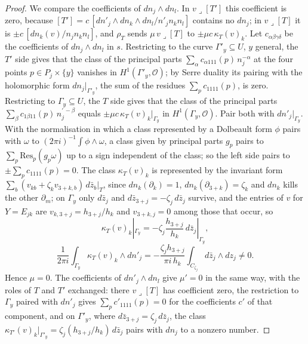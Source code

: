 \documentclass[11pt,reqno]{amsart}
\numberwithin{equation}{section}
\theoremstyle{plain}
\theoremstyle{definition}
\begin{document}
\begin{proof}
We compare the coefficients of $dn_{j}\wedge dn_{l}$. In $v\lrcorner[T']$ this coefficient is zero, because $[T']=c\,[dn'_{j}\wedge dn_{k}\wedge dn_{l}/n'_{j}n_{k}n_{l}]$ contains no $dn_{j}$; in $v\lrcorner[T]$ it is $\pm c\,[dn_{k}(v)/n_{j}n_{k}n_{l}]$, and $\rho_{T}$ sends $\mu\,v\lrcorner[T]$ to $\pm\mu c\,\kappa_{T}(v)_{k}$. Let $c_{\alpha\beta\gamma\delta}$ be the coefficients of $dn_{j}\wedge dn_{l}$ in $s$. Restricting to the curve $\Gamma'_{y}\subseteq U$, $y$ general, the $T'$ side gives that the class of the principal parts $\sum_{\alpha}c_{\alpha111}(p)\,n_{j}^{-\alpha}$ at the four points $p\in P_{j}\times\{y\}$ vanishes in $H^{1}(\Gamma'_{y},\mathcal{O})$; by Serre duality its pairing with the holomorphic form $dn_{j}|_{\Gamma'_{y}}$, the sum of the residues $\sum_{p}c_{1111}(p)$, is zero. Restricting to $\Gamma_{y}\subseteq U$, the $T$ side gives that the class of the principal parts $\sum_{\beta}c_{1\beta11}(p)\,n_{j}^{\prime\,-\beta}$ equals $\pm\mu c\,\kappa_{T}(v)_{k}|_{\Gamma_{y}}$ in $H^{1}(\Gamma_{y},\mathcal{O})$. Pair both with $dn'_{j}|_{\Gamma_{y}}$. With the normalisation in which a class represented by a Dolbeault form $\phi$ pairs with $\omega$ to $(2\pi i)^{-1}\int\phi\wedge\omega$, a class given by principal parts $g_{p}$ pairs to $\sum_{p}\mathrm{Res}_{p}(g_{p}\omega)$ up to a sign independent of the class; so the left side pairs to $\pm\sum_{p}c_{1111}(p)=0$. The class $\kappa_{T}(v)_{k}$ is represented by the invariant form $\sum_{b}(v_{kb}+\zeta_{k}v_{3+k,b})\,d\bar z_{b}|_{T}$, since $dn_{k}(\partial_{k})=1$, $dn_{k}(\partial_{3+k})=\zeta_{k}$ and $dn_{k}$ kills the other $\partial_{m}$; on $\Gamma_{y}$ only $d\bar z_{j}$ and $d\bar z_{3+j}=-\zeta_{j}\,d\bar z_{j}$ survive, and the entries of $v$ for $Y=E_{jk}$ are $v_{k,3+j}=h_{3+j}/h_{k}$ and $v_{3+k,j}=0$ among those that occur, so
\[
\kappa_{T}(v)_{k}|_{\Gamma_{y}}=-\zeta_{j}\frac{h_{3+j}}{h_{k}}\,d\bar z_{j}|_{\Gamma_{y}},
\]
\[
\frac{1}{2\pi i}\int_{\Gamma_{y}}\kappa_{T}(v)_{k}\wedge dn'_{j}=-\frac{\zeta_{j}h_{3+j}}{\pi i\,h_{k}}\int_{C_{\zeta_{j}}}d\bar z_{j}\wedge dz_{j}\ne0 .
\]
Hence $\mu=0$. The coefficients of $dn'_{j}\wedge dn_{l}$ give $\mu'=0$ in the same way, with the roles of $T$ and $T'$ exchanged: there $v\lrcorner[T]$ has coefficient zero, the restriction to $\Gamma_{y}$ paired with $dn'_{j}$ gives $\sum_{p}c'_{1111}(p)=0$ for the coefficients $c'$ of that component, and on $\Gamma'_{y}$, where $d\bar z_{3+j}=\zeta_{j}\,d\bar z_{j}$, the class $\kappa_{T'}(v)_{k}|_{\Gamma'_{y}}=\zeta_{j}(h_{3+j}/h_{k})\,d\bar z_{j}$ pairs with $dn_{j}$ to a nonzero number.
\end{proof}
\end{document}

